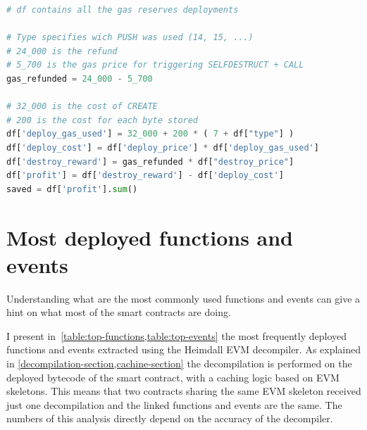 \begin{lstlisting}[language=Python,label={lst:gas-calc},caption={Code for computing the total Eth saved with the GasToken pattern.},captionpos=b]
# df contains all the gas reserves deployments 

# Type specifies wich PUSH was used (14, 15, ...)
# 24_000 is the refund
# 5_700 is the gas price for triggering SELFDESTRUCT + CALL
gas_refunded = 24_000 - 5_700 

# 32_000 is the cost of CREATE
# 200 is the cost for each byte stored
df['deploy_gas_used'] = 32_000 + 200 * ( 7 + df["type"] )
df['deploy_cost'] = df['deploy_price'] * df['deploy_gas_used']
df['destroy_reward'] = gas_refunded * df["destroy_price"]
df['profit'] = df['destroy_reward'] - df['deploy_cost']
saved = df['profit'].sum()
\end{lstlisting}

\newpage


\newpage

\section{Most deployed functions and events}

Understanding what are the most commonly used functions and events can give a hint on what most of the smart contracts are doing.

I present in~\cref{table:top-functions,table:top-events} the most frequently deployed functions and events extracted using the Heimdall EVM decompiler. As explained in \cref{decompilation-section,cachine-section} the decompilation is performed on the deployed bytecode of the smart contract, with a caching logic based on EVM skeletons. This means that two contracts sharing the same EVM skeleton received just one decompilation and the linked functions and events are the same. The numbers of this analysis directly depend on the accuracy of the decompiler.

